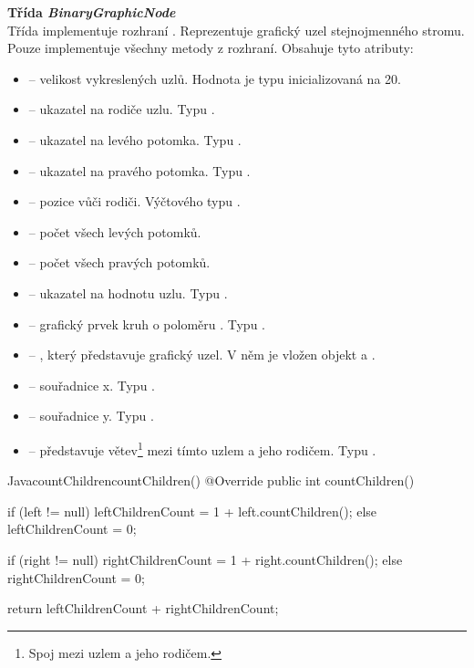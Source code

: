 \documentclass[
  biblatex=false,
  font=serif,
  glossaries=false,
  tables=false,
  theorems=false,
  index
]{kidiplom}
\begin{document}
\noindent \textbf{Třída \textit{BinaryGraphicNode}}\\
\indent Třída implementuje rozhraní . Reprezentuje grafický uzel stejnojmenného stromu. Pouze implementuje všechny metody z rozhraní. Obsahuje tyto atributy:
\begin{itemize}
\item {} -- velikost vykreslených uzlů. Hodnota je typu  inicializovaná na 20.
\item {} -- ukazatel na rodiče uzlu. Typu .
\item {} -- ukazatel na levého potomka. Typu .
\item {} -- ukazatel na pravého potomka. Typu .
\item {} -- pozice vůči rodiči. Výčtového typu .
\item {} -- počet všech levých potomků.
\item {} -- počet všech pravých potomků.
\item {} -- ukazatel na hodnotu uzlu. Typu .
\item {} -- grafický prvek kruh o poloměru . Typu .
\item {} -- , který představuje grafický uzel. V něm je vložen objekt  a .
\item {} -- souřadnice  x. Typu .
\item {} -- souřadnice  y. Typu .
\item {} -- představuje větev\footnote{Spoj mezi uzlem a jeho rodičem.} mezi tímto uzlem a jeho rodičem. Typu .
\end{itemize}

\begin{kicode}{Java}{countChildren}{countChildren()}
@Override
public int countChildren() {
	if (left != null) {
		leftChildrenCount = 1 + left.countChildren();
	} else {
		leftChildrenCount = 0;
	}

	if (right != null) {
		rightChildrenCount = 1 + right.countChildren();
	} else {
		rightChildrenCount = 0;
	}
		
	return leftChildrenCount + rightChildrenCount;
}
\end{kicode}
\end{document}
